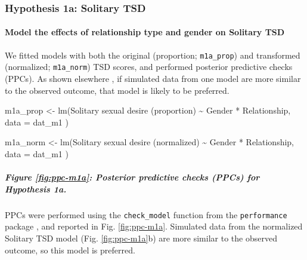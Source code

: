\documentclass[
  bookmarksnumbered]{article}
\newenvironment{Shaded}{\begin{snugshade}}{\end{snugshade}}
\newcommand{\AttributeTok}[1]{\textcolor[rgb]{0.80,0.80,0.80}{#1}}
\newcommand{\FunctionTok}[1]{\textcolor[rgb]{0.94,0.94,0.56}{#1}}
\newcommand{\NormalTok}[1]{\textcolor[rgb]{0.80,0.80,0.80}{#1}}
\newcommand{\OtherTok}[1]{\textcolor[rgb]{0.94,0.94,0.56}{#1}}
\newcommand{\SpecialCharTok}[1]{\textcolor[rgb]{0.86,0.64,0.64}{#1}}
\newcommand{\StringTok}[1]{\textcolor[rgb]{0.80,0.58,0.58}{#1}}
\begin{document}
\subsubsection{Hypothesis 1a: Solitary TSD}\label{hypothesis1a}

\paragraph{Model the effects of relationship type and gender on Solitary TSD}\label{model-the-effects-of-relationship-type-and-gender-on-solitary-tsd}

We fitted models with both the original (proportion; \texttt{m1a\_prop}) and transformed (normalized; \texttt{m1a\_norm}) TSD scores, and performed posterior predictive checks (PPCs). As shown elsewhere \autocite[e.g.,][]{gabryVisualizationBayesianWorkflow2019}, if simulated data from one model are more similar to the observed outcome, that model is likely to be preferred.

\begin{Shaded}
\begin{Highlighting}[]
\NormalTok{m1a\_prop }\OtherTok{\textless{}{-}} \FunctionTok{lm}\NormalTok{(}\StringTok{\textasciigrave{}}\AttributeTok{Solitary sexual desire (proportion)}\StringTok{\textasciigrave{}} \SpecialCharTok{\textasciitilde{}}\NormalTok{ Gender }\SpecialCharTok{*}\NormalTok{ Relationship,}
  \AttributeTok{data =}\NormalTok{ dat\_m1}
\NormalTok{)}

\NormalTok{m1a\_norm }\OtherTok{\textless{}{-}} \FunctionTok{lm}\NormalTok{(}\StringTok{\textasciigrave{}}\AttributeTok{Solitary sexual desire (normalized)}\StringTok{\textasciigrave{}} \SpecialCharTok{\textasciitilde{}}\NormalTok{ Gender }\SpecialCharTok{*}\NormalTok{ Relationship,}
  \AttributeTok{data =}\NormalTok{ dat\_m1}
\NormalTok{)}
\end{Highlighting}
\end{Shaded}

\subparagraph{Figure \ref{fig:ppc-m1a}: Posterior predictive checks (PPCs) for Hypothesis 1a.}\label{figure-reffigppc-m1a-posterior-predictive-checks-ppcs-for-hypothesis-1a.}

PPCs were performed using the \texttt{check\_model} function from the \texttt{performance} package \autocite{ludecke2021}, and reported in Fig. \ref{fig:ppc-m1a}. Simulated data from the normalized Solitary TSD model (Fig. \ref{fig:ppc-m1a}b) are more similar to the observed outcome, so this model is preferred.
\end{document}
